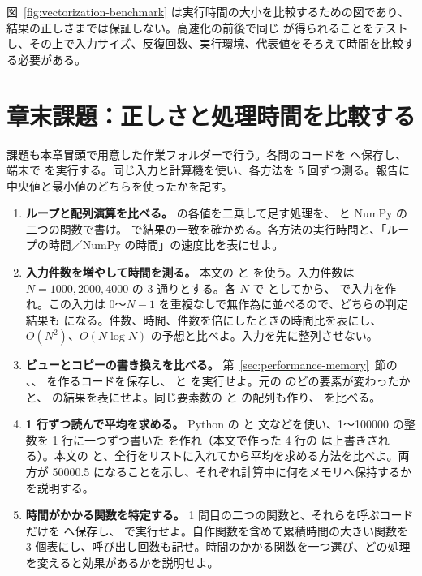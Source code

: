 図~\ref{fig:vectorization-benchmark} は実行時間の大小を比較するための図であり、結果の正しさまでは保証しない。高速化の前後で同じ  が得られることをテストし、その上で入力サイズ、反復回数、実行環境、代表値をそろえて時間を比較する必要がある。

\section{章末課題：正しさと処理時間を比較する}

課題も本章冒頭で用意した作業フォルダーで行う。各問のコードを  へ保存し、端末で  を実行する。同じ入力と計算機を使い、各方法を 5 回ずつ測る。報告に中央値と最小値のどちらを使ったかを記す。

\begin{enumerate}
\item \textbf{ループと配列演算を比べる。}
 の各値を二乗して足す処理を、 と NumPy の二つの関数で書け。 で結果の一致を確かめる。各方法の実行時間と、「ループの時間／NumPy の時間」の速度比を表にせよ。

\item \textbf{入力件数を増やして時間を測る。}
本文の  と  を使う。入力件数は \(N=1000,2000,4000\) の 3 通りとする。各 \(N\) で  としてから、 で入力を作れ。この入力は 0～\(N-1\) を重複なしで無作為に並べるので、どちらの判定結果も  になる。件数、時間、件数を倍にしたときの時間比を表にし、\(O(N^2)\)、\(O(N\log N)\) の予想と比べよ。入力を先に整列させない。

\item \textbf{ビューとコピーの書き換えを比べる。}
第~\ref{sec:performance-memory}~節の 、、 を作るコードを保存し、 と  を実行せよ。元の  のどの要素が変わったかと、 の結果を表にせよ。同じ要素数の  と  の配列も作り、 を比べる。

\item \textbf{1 行ずつ読んで平均を求める。}
Python の  と  文などを使い、1～100000 の整数を 1 行に一つずつ書いた  を作れ（本文で作った 4 行の  は上書きされる）。本文の  と、全行をリストに入れてから平均を求める方法を比べよ。両方が 50000.5 になることを示し、それぞれ計算中に何をメモリへ保持するかを説明する。

\item \textbf{時間がかかる関数を特定する。}
1 問目の二つの関数と、それらを呼ぶコードだけを  へ保存し、 で実行せよ。自作関数を含めて累積時間の大きい関数を 3 個表にし、呼び出し回数も記せ。時間のかかる関数を一つ選び、どの処理を変えると効果があるかを説明せよ。

\end{enumerate}
